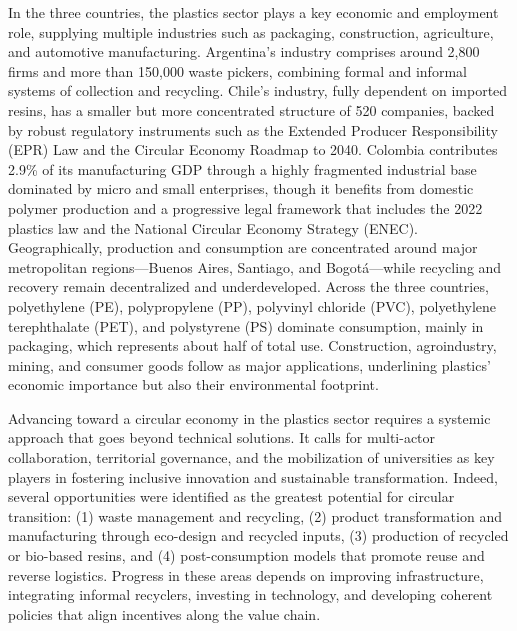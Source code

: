\documentclass[
  12pt,
  oneside]{book}
\begin{document}
In the three countries, the plastics sector plays a key economic and
employment role, supplying multiple industries such as packaging,
construction, agriculture, and automotive manufacturing. Argentina's
industry comprises around 2,800 firms and more than 150,000 waste
pickers, combining formal and informal systems of collection and
recycling. Chile's industry, fully dependent on imported resins, has a
smaller but more concentrated structure of 520 companies, backed by
robust regulatory instruments such as the Extended Producer
Responsibility (EPR) Law and the Circular Economy Roadmap to 2040.
Colombia contributes 2.9\% of its manufacturing GDP through a highly
fragmented industrial base dominated by micro and small enterprises,
though it benefits from domestic polymer production and a progressive
legal framework that includes the 2022 plastics law and the National
Circular Economy Strategy (ENEC). Geographically, production and
consumption are concentrated around major metropolitan regions---Buenos
Aires, Santiago, and Bogotá---while recycling and recovery remain
decentralized and underdeveloped. Across the three countries,
polyethylene (PE), polypropylene (PP), polyvinyl chloride (PVC),
polyethylene terephthalate (PET), and polystyrene (PS) dominate
consumption, mainly in packaging, which represents about half of total
use. Construction, agroindustry, mining, and consumer goods follow as
major applications, underlining plastics' economic importance but also
their environmental footprint.

Advancing toward a circular economy in the plastics sector requires a
systemic approach that goes beyond technical solutions. It calls for
multi-actor collaboration, territorial governance, and the mobilization
of universities as key players in fostering inclusive innovation and
sustainable transformation. Indeed, several opportunities were
identified as the greatest potential for circular transition: (1) waste
management and recycling, (2) product transformation and manufacturing
through eco-design and recycled inputs, (3) production of recycled or
bio-based resins, and (4) post-consumption models that promote reuse and
reverse logistics. Progress in these areas depends on improving
infrastructure, integrating informal recyclers, investing in technology,
and developing coherent policies that align incentives along the value
chain.
\end{document}
